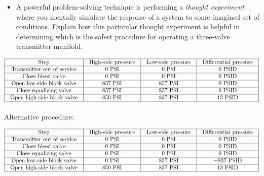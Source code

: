\begin{itemize}
\item{} A powerful problem-solving technique is performing a {\it thought experiment} where you mentally simulate the response of a system to some imagined set of conditions.  Explain how this particular thought experiment is helpful in determining which is the safest procedure for operating a three-valve transmitter manifold.
\end{itemize}















$$\vbox{\offinterlineskip
\halign{\strut
\vrule \quad\hfil # \ \hfil & 
\vrule \quad\hfil # \ \hfil & 
\vrule \quad\hfil # \ \hfil & 
\vrule \quad\hfil # \ \hfil \vrule \cr
\noalign{\hrule}
%
Step & High-side pressure & Low-side pressure & Differential pressure \cr
%
\noalign{\hrule}
%
Transmitter out of service & 0 PSI & 0 PSI & 0 PSID \cr
%
\noalign{\hrule}
%
Close bleed valve & 0 PSI & 0 PSI & 0 PSID \cr
%
\noalign{\hrule}
%
Open low-side block valve & 837 PSI & 837 PSI & 0 PSID \cr
%
\noalign{\hrule}
%
Close equalizing valve & 837 PSI & 837 PSI & 0 PSID \cr
%
\noalign{\hrule}
%
Open high-side block valve & 850 PSI & 837 PSI & 13 PSID \cr
%
\noalign{\hrule}
} %
}$$ %

\vskip 10pt

Alternative procedure:


$$\vbox{\offinterlineskip
\halign{\strut
\vrule \quad\hfil # \ \hfil & 
\vrule \quad\hfil # \ \hfil & 
\vrule \quad\hfil # \ \hfil & 
\vrule \quad\hfil # \ \hfil \vrule \cr
\noalign{\hrule}
%
Step & High-side pressure & Low-side pressure & Differential pressure \cr
%
\noalign{\hrule}
%
Transmitter out of service & 0 PSI & 0 PSI & 0 PSID \cr
%
\noalign{\hrule}
%
Close bleed valve & 0 PSI & 0 PSI & 0 PSID \cr
%
\noalign{\hrule}
%
Close equalizing valve & 0 PSI & 0 PSI & 0 PSID \cr
%
\noalign{\hrule}
%
Open low-side block valve & 0 PSI & 837 PSI & $-837$ PSID \cr
%
\noalign{\hrule}
%
Open high-side block valve & 850 PSI & 837 PSI & 13 PSID \cr
%
\noalign{\hrule}
} %
}$$ %

